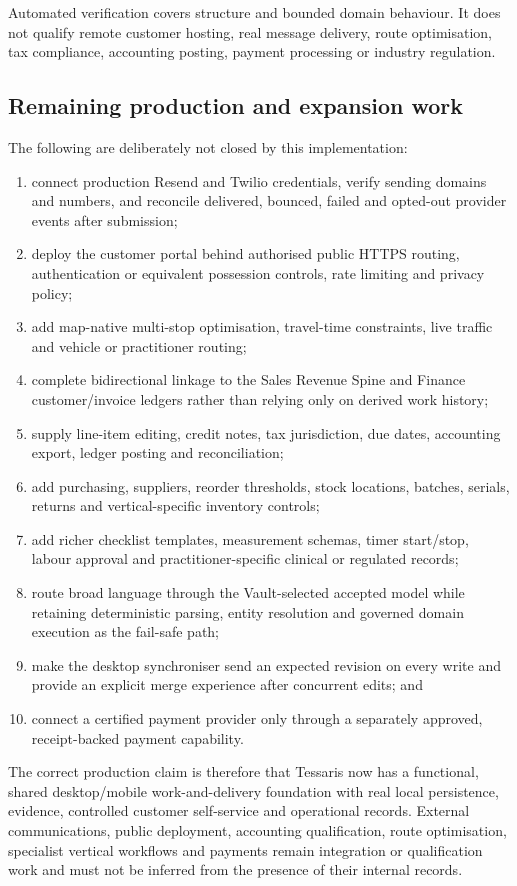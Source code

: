 Automated verification covers structure and bounded domain behaviour.  It does
not qualify remote customer hosting, real message delivery, route optimisation,
tax compliance, accounting posting, payment processing or industry regulation.

\subsection{Remaining production and expansion work}

The following are deliberately not closed by this implementation:
\begin{enumerate}[leftmargin=*]
  \item connect production Resend and Twilio credentials, verify sending domains
        and numbers, and reconcile delivered, bounced, failed and opted-out
        provider events after submission;
  \item deploy the customer portal behind authorised public HTTPS routing,
        authentication or equivalent possession controls, rate limiting and
        privacy policy;
  \item add map-native multi-stop optimisation, travel-time constraints, live
        traffic and vehicle or practitioner routing;
  \item complete bidirectional linkage to the Sales Revenue Spine and Finance
        customer/invoice ledgers rather than relying only on derived work history;
  \item supply line-item editing, credit notes, tax jurisdiction, due dates,
        accounting export, ledger posting and reconciliation;
  \item add purchasing, suppliers, reorder thresholds, stock locations, batches,
        serials, returns and vertical-specific inventory controls;
  \item add richer checklist templates, measurement schemas, timer start/stop,
        labour approval and practitioner-specific clinical or regulated records;
  \item route broad language through the Vault-selected accepted model while
        retaining deterministic parsing, entity resolution and governed domain
        execution as the fail-safe path;
  \item make the desktop synchroniser send an expected revision on every write
        and provide an explicit merge experience after concurrent edits; and
  \item connect a certified payment provider only through a separately approved,
        receipt-backed payment capability.
\end{enumerate}

The correct production claim is therefore that Tessaris now has a functional,
shared desktop/mobile work-and-delivery foundation with real local persistence,
evidence, controlled customer self-service and operational records.  External
communications, public deployment, accounting qualification, route optimisation,
specialist vertical workflows and payments remain integration or qualification
work and must not be inferred from the presence of their internal records.
